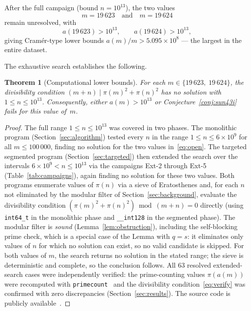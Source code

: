 \documentclass[11pt]{article}
\newtheorem{theorem}{Theorem}
\theoremstyle{definition}
\theoremstyle{remark}
\numberwithin{equation}{section}
\begin{document}
After the full campaign (bound $n = 10^{13}$), the two values
\begin{equation}\label{eq:open}
m = 19\,623 \quad\text{and}\quad m = 19\,624
\end{equation}
remain unresolved, with
\[
a(19\,623) > 10^{13}, \qquad a(19\,624) > 10^{13},
\]
giving Cram\'er-type lower bounds
$a(m)/m > 5.095 \times 10^8$ --- the largest in the entire dataset.

The exhaustive search establishes the following.

\begin{theorem}[Computational lower bounds]\label{thm:lower}
For each $m \in \{19\,623,\; 19\,624\}$, the divisibility condition
$(m+n) \mid \pi(m)^2 + \pi(n)^2$ has no solution with
$1 \le n \le 10^{13}$.
Consequently, either $a(m) > 10^{13}$ or
Conjecture~\textup{\ref{conj:sun43i}} fails for this value of~$m$.
\end{theorem}

\begin{proof}
The full range $1 \le n \le 10^{13}$ was covered in two phases.
The monolithic program 
(Section~\ref{sec:algorithm}) tested every $n$ in the range
$1 \le n \le 6 \times 10^9$ for all $m \le 100\,000$,
finding no solution for the two values in~\eqref{eq:open}.
The targeted segmented program
(Section~\ref{sec:targeted}) then extended the search over
the intervals $6 \times 10^9 < n \le 10^{13}$ via the
campaigns Ext-2 through Ext-5 (Table~\ref{tab:campaigns}),
again finding no solution for these two values.
Both programs enumerate values of $\pi(n)$ via a sieve of
Eratosthenes and, for each $n$ not eliminated by the modular
filter of Section~\ref{sec:background}, evaluate the
divisibility condition
$(\pi(m)^2 + \pi(n)^2) \bmod (m+n) = 0$ directly
(using \texttt{int64\_t} in the monolithic phase and
\texttt{\_\_int128} in the segmented phase).
The modular filter is \emph{sound}
(Lemma~\ref{lem:obstruction}), including the self-blocking
prime check, which is a special case of the Lemma with $q = s$:
it eliminates only values of $n$ for
which no solution can exist, so no valid candidate is skipped.
For both values of $m$, the search returns no solution in the
stated range; the sieve is deterministic and complete, so the
conclusion follows.
All $63$ resolved extended-search cases were independently
verified: the prime-counting values $\pi(a(m))$ were recomputed
with \texttt{primecount}~\cite{primecount} and the divisibility
condition~\eqref{eq:verify} was confirmed with zero discrepancies
(Section~\ref{sec:results}).
The source code is publicly available~\cite{GithubRepo}.
\end{proof}
\end{document}
